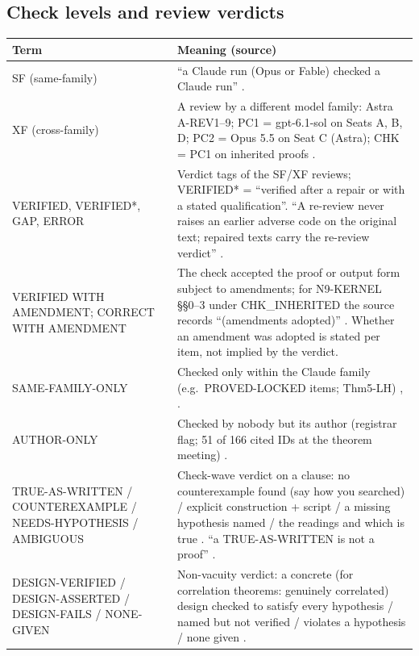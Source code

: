 \subsection{Check levels and review verdicts}
{\small
\begin{xltabular}{\textwidth}{@{}>{\raggedright\arraybackslash}p{4.4cm}>{\raggedright\arraybackslash}X@{}}
\toprule
\textbf{Term} & \textbf{Meaning (source)} \\
\midrule
\endhead
SF (same-family) & ``a Claude run (Opus or Fable) checked a Claude run'' . \\
XF (cross-family) & A review by a different model family: Astra A-REV1--9; PC1 = gpt-6.1-sol on Seats A, B, D; PC2 = Opus 5.5 on Seat C (Astra); CHK = PC1 on inherited proofs . \\
VERIFIED, VERIFIED*, GAP, ERROR & Verdict tags of the SF/XF reviews; VERIFIED* = ``verified after a repair or with a stated qualification''. ``A re-review never raises an earlier adverse code on the original text; repaired texts carry the re-review verdict'' . \\
VERIFIED WITH AMENDMENT; CORRECT WITH AMENDMENT & The check accepted the proof or output form subject to amendments; for N9-KERNEL §§0--3 under CHK\_INHERITED the source records ``(amendments adopted)'' . Whether an amendment was adopted is stated per item, not implied by the verdict. \\
SAME-FAMILY-ONLY & Checked only within the Claude family (e.g.\ PROVED-LOCKED items; Thm5-LH) , . \\
AUTHOR-ONLY & Checked by nobody but its author (registrar flag; 51 of 166 cited IDs at the theorem meeting) . \\
TRUE-AS-WRITTEN / COUNTEREXAMPLE / NEEDS-HYPOTHESIS / AMBIGUOUS & Check-wave verdict on a clause: no counterexample found (say how you searched) / explicit construction + script / a missing hypothesis named / the readings and which is true . ``a TRUE-AS-WRITTEN is not a proof'' . \\
DESIGN-VERIFIED / DESIGN-ASSERTED / DESIGN-FAILS / NONE-GIVEN & Non-vacuity verdict: a concrete (for correlation theorems: genuinely correlated) design checked to satisfy every hypothesis / named but not verified / violates a hypothesis / none given . \\

\end{xltabular}}
